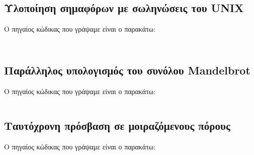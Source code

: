 \documentclass[a4paper,10pt]{article} \usepackage{anysize}
\begin{document}


\section*{} \setcounter{section}{1}
\subsection{Υλοποίηση σημαφόρων με σωληνώσεις του UNIX} 
Ο πηγαίος κώδικας που γράψαμε είναι ο παρακάτω:
\inputminted[linenos,fontsize=\footnotesize,frame=leftline]{c}{files/pipesem.h}
\inputminted[linenos,fontsize=\footnotesize,frame=leftline]{c}{files/pipesem.c}

\subsection{Παράλληλος υπολογισμός του συνόλου Mandelbrot} 
Ο πηγαίος κώδικας που γράψαμε είναι ο παρακάτω:
\inputminted[linenos,fontsize=\footnotesize,frame=leftline]{c}{files/mandel.c}

\subsection{Ταυτόχρονη πρόσβαση σε μοιραζόμενους πόρους}
Ο πηγαίος κώδικας που γράψαμε είναι ο παρακάτω:
\inputminted[linenos,fontsize=\footnotesize,frame=leftline]{c}{files/procs-shm.c}
\end{document}
